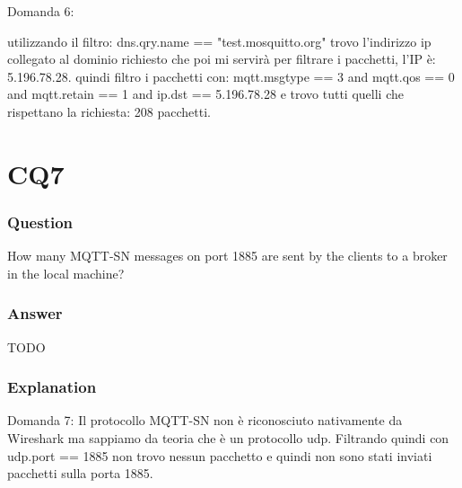 Domanda 6:

utilizzando il filtro: dns.qry.name == "test.mosquitto.org" trovo l'indirizzo ip collegato al dominio richiesto che poi mi servirà per filtrare i pacchetti, l'IP è:  5.196.78.28.
quindi filtro i pacchetti con: mqtt.msgtype == 3 and mqtt.qos == 0 and mqtt.retain == 1 and ip.dst == 5.196.78.28 e trovo tutti quelli che rispettano la richiesta: 208 pacchetti.

\section{CQ7}
\subsubsection{Question}
How many MQTT-SN messages on port 1885 are sent by the clients to a broker in the local machine?

\subsubsection{Answer}
TODO 

\subsubsection{Explanation}

Domanda 7: 
Il protocollo MQTT-SN non è riconosciuto nativamente da Wireshark ma sappiamo da teoria che è un protocollo udp. Filtrando quindi con udp.port == 1885 non trovo nessun pacchetto e quindi non sono stati inviati pacchetti sulla porta 1885.

























